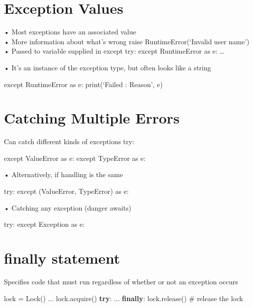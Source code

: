 \documentclass[
  letterpaper,
  DIV=11,
  numbers=noendperiod]{scrreprt}
\newenvironment{Shaded}{\begin{snugshade}}{\end{snugshade}}
\newcommand{\CommentTok}[1]{\textcolor[rgb]{0.37,0.37,0.37}{#1}}
\newcommand{\ControlFlowTok}[1]{\textcolor[rgb]{0.00,0.23,0.31}{\textbf{#1}}}
\newcommand{\NormalTok}[1]{\textcolor[rgb]{0.00,0.23,0.31}{#1}}
\newcommand{\OperatorTok}[1]{\textcolor[rgb]{0.37,0.37,0.37}{#1}}
\begin{document}

\chapter{Exception Values}\label{exception-values}

• Most exceptions have an associated value\\
• More information about what's wrong raise RuntimeError(`Invalid user
name')\\
• Passed to variable supplied in except try: except RuntimeError as e:
\ldots{}

• It's an instance of the exception type, but often looks like a string

except RuntimeError as e: print(`Failed : Reason', e)


\chapter{Catching Multiple Errors}\label{catching-multiple-errors}

Can catch different kinds of exceptions try:

except ValueError as e: except TypeError as e:

• Alternatively, if handling is the same

try: except (ValueError, TypeError) as e:

• Catching any exception (danger awaits)

try: except Exception as e:


\chapter{finally statement}\label{finally-statement}

Specifies code that must run regardless of whether or not an exception
occurs

\begin{Shaded}
\begin{Highlighting}[]
\NormalTok{lock }\OperatorTok{=}\NormalTok{ Lock()}
\NormalTok{...}
\NormalTok{lock.acquire()}
\ControlFlowTok{try}\NormalTok{:}
\NormalTok{...}
\ControlFlowTok{finally}\NormalTok{:}
\NormalTok{    lock.release()  }\CommentTok{\# release the lock }
\end{Highlighting}
\end{Shaded}
\end{document}
